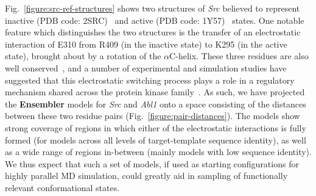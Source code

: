 \documentclass[aps,pre,twocolumn,nofootinbib,superscriptaddress,linenumbers]{revtex4-1}
\begin{document}
Fig.~\ref{figure:src-ref-structures} shows two structures of \emph{Src} believed to represent inactive (PDB code: 2SRC)~\cite{xu:1999:2src} and active (PDB code: 1Y57)~\cite{cowan-jacob:2005:1y57} states.
One notable feature which distinguishes the two structures is the transfer of an electrostatic interaction of E310 from R409 (in the inactive state) to K295 (in the active state), brought about by a rotation of the $\alpha$C-helix.
These three residues are also well conserved~\cite{kannan:jmb:2005:kinase-regulation}, and a number of experimental and simulation studies have suggested that this electrostatic switching process plays a role in a regulatory mechanism shared across the protein kinase family~\cite{shukla-pande:nature-commun:2014:src-activation-msm, foda:nat-comm:2015:src, ozkirimli:prot-sci:2008:src}.
As such, we have projected the {\bf Ensembler} models for \emph{Src} and \emph{Abl1} onto a space consisting of the distances between these two residue pairs (Fig.~\ref{figure:pair-distances}).
The models show strong coverage of regions in which either of the electrostatic interactions is fully formed (for models across all levels of target-template sequence identity), as well as a wide range of regions in-between (mainly models with low sequence identity).
We thus expect that such a set of models, if used as starting configurations for highly parallel MD simulation, could greatly aid in sampling of functionally relevant conformational states.

\end{document}
